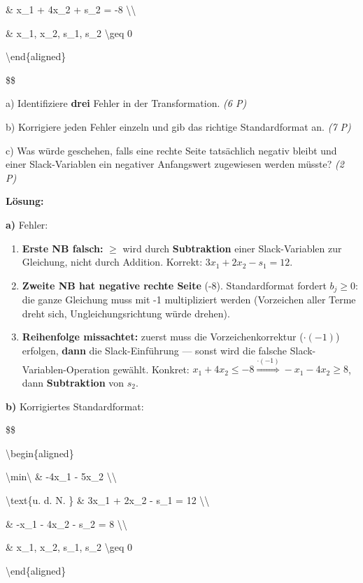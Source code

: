 \documentclass[11pt, a4paper]{article}
\begin{document}
\& x\_1 + 4x\_2 + s\_2 = -8 \textbackslash{}\textbackslash{}

\& x\_1, x\_2, s\_1, s\_2 \textbackslash{}geq 0

\textbackslash{}end\{aligned\}

\$\$


a) Identifiziere \textbf{drei} Fehler in der Transformation. \textit{(6 P)}

b) Korrigiere jeden Fehler einzeln und gib das richtige Standardformat an. \textit{(7 P)}

c) Was würde geschehen, falls eine rechte Seite tatsächlich negativ bleibt und einer Slack-Variablen ein negativer Anfangswert zugewiesen werden müsste? \textit{(2 P)}


\textbf{Lösung:}


\textbf{a)} Fehler:

\begin{enumerate}
  \item \textbf{Erste NB falsch:} $\geq$ wird durch \textbf{Subtraktion} einer Slack-Variablen zur Gleichung, nicht durch Addition. Korrekt: $3x_1 + 2x_2 - s_1 = 12$.
  \item \textbf{Zweite NB hat negative rechte Seite} (-8). Standardformat fordert $b_j \geq 0$: die ganze Gleichung muss mit -1 multipliziert werden (Vorzeichen aller Terme dreht sich, Ungleichungsrichtung würde drehen).
  \item \textbf{Reihenfolge missachtet:} zuerst muss die Vorzeichenkorrektur ($\cdot (-1)$) erfolgen, \textbf{dann} die Slack-Einführung — sonst wird die falsche Slack-Variablen-Operation gewählt. Konkret: $x_1 + 4x_2 \leq -8 \overset{\cdot(-1)}{\Longrightarrow} -x_1 - 4x_2 \geq 8$, dann \textbf{Subtraktion} von $s_2$.
\end{enumerate}

\textbf{b)} Korrigiertes Standardformat:


\$\$

\textbackslash{}begin\{aligned\}

\textbackslash{}min\textbackslash{} \& -4x\_1 - 5x\_2 \textbackslash{}\textbackslash{}

\textbackslash{}text\{u. d. N. \} \& 3x\_1 + 2x\_2 - s\_1 = 12 \textbackslash{}\textbackslash{}

\& -x\_1 - 4x\_2 - s\_2 = 8 \textbackslash{}\textbackslash{}

\& x\_1, x\_2, s\_1, s\_2 \textbackslash{}geq 0

\textbackslash{}end\{aligned\}
\end{document}

